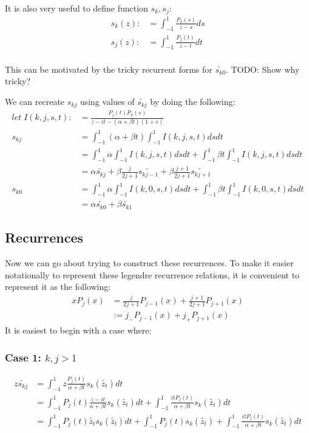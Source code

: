 \documentclass{article}
\begin{document}
It is also very useful to define function $s_k, s_j$:
\begin{align}
	s_k(z) :&= \int_{-1}^1\frac{P_k(s)}{z-s}ds \\ 
	s_j(z) :&= \int_{-1}^1\frac{P_j(t)}{z-t}dt \\ 
\end{align}

This can be motivated by the tricky recurrent forms for $\tilde{s_{k0}}$.
TODO: Show why tricky?

We can recreate $s_{kj}$ using values of $\tilde{s_{kj}}$ by doing the following:
\begin{align}
	let\; I(k,j,s,t) :&= \frac{P_j(t)P_k(s)}{z-it-(\alpha+\beta t)(1+s)}\\ 
	s_{kj} &= \int_{-1}^1(\alpha+\beta t)\int_{-1}^1 I(k,j,s,t) dsdt\\
	&= \int_{-1}^1\alpha\int_{-1}^1 I(k,j,s,t)dsdt +
	\int_{-1}^1\beta t\int_{-1}^1 I(k,j,s,t) dsdt\\
	&= \alpha\tilde{s_{kj}} + \beta\frac{j}{2j+1}\tilde{s_{kj-1}} + \beta\frac{j+1}{2j+1}\tilde{s_{kj+1}} \\
	s_{k0} &= \int_{-1}^1\alpha\int_{-1}^1 I(k,0,s,t)dsdt +
	\int_{-1}^1\beta t\int_{-1}^1 I(k,0,s,t) dsdt \\
	&= \alpha\tilde{s_{k0}} + \beta\tilde{s_{k1}}
\end{align}

\subsection{Recurrences}

Now we can go about trying to construct these recurrences.
To make it easier notationally to represent these legendre recurrence relations, it is convenient to represent it as the following:
\begin{align}
    xP_j(x) &= \frac{j}{2j+1}P_{j-1}(x)+\frac{j+1}{2j+1}P_{j+1}(x) \\
    &:= j_-P_{j-1}(x)+j_+P_{j+1}(x)
\end{align}
It is easiest to begin with a case where:

\subsubsection{Case 1: $k,j>1$}

\begin{align}
	z\tilde{s_{kj}}&=\int_{-1}^1z\frac{P_j(t)}{\alpha+\beta t}s_k(\tilde{z_t})dt\\
	&=\int_{-1}^1P_j(t)\frac{z-it}{\alpha+\beta t}s_k(\tilde{z_t})dt
	+\int_{-1}^1\frac{itP_j(t)}{\alpha+\beta t}s_k(\tilde{z_t})dt\\
	&=\int_{-1}^1P_j(t)\tilde{z_t}s_k(\tilde{z_t})dt
	+\int_{-1}^1P_j(t)s_k(\tilde{z_t})
	+\int_{-1}^1\frac{itP_j(t)}{\alpha+\beta t}s_k(\tilde{z_t})dt\\
\end{align}
\end{document}
